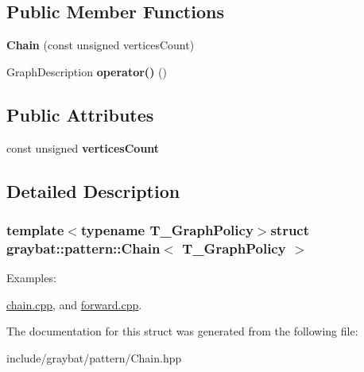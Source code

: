 \subsection*{Public Member Functions}
\begin{DoxyCompactItemize}
\item 
\hypertarget{structgraybat_1_1pattern_1_1Chain_a402338c3085ed3c600e152fc9a103560}{}{\bfseries Chain} (const unsigned vertices\+Count)\label{structgraybat_1_1pattern_1_1Chain_a402338c3085ed3c600e152fc9a103560}

\item 
\hypertarget{structgraybat_1_1pattern_1_1Chain_a6f2a11f24e1b975affe052abfebc1a2e}{}Graph\+Description {\bfseries operator()} ()\label{structgraybat_1_1pattern_1_1Chain_a6f2a11f24e1b975affe052abfebc1a2e}

\end{DoxyCompactItemize}
\subsection*{Public Attributes}
\begin{DoxyCompactItemize}
\item 
\hypertarget{structgraybat_1_1pattern_1_1Chain_a982684cf94d21e18d707403acde3c9bf}{}const unsigned {\bfseries vertices\+Count}\label{structgraybat_1_1pattern_1_1Chain_a982684cf94d21e18d707403acde3c9bf}

\end{DoxyCompactItemize}


\subsection{Detailed Description}
\subsubsection*{template$<$typename T\+\_\+\+Graph\+Policy$>$struct graybat\+::pattern\+::\+Chain$<$ T\+\_\+\+Graph\+Policy $>$}

\begin{Desc}
\item[Examples\+: ]\par
\hyperlink{chain_8cpp-example}{chain.\+cpp}, and \hyperlink{forward_8cpp-example}{forward.\+cpp}.\end{Desc}


The documentation for this struct was generated from the following file\+:\begin{DoxyCompactItemize}
\item 
include/graybat/pattern/Chain.\+hpp\end{DoxyCompactItemize}
